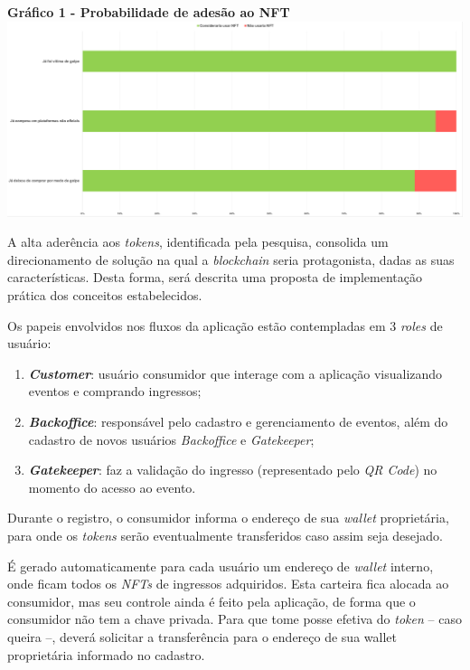 {\begin{center}
    \centering
    \textbf{Gráfico 1 - Probabilidade de adesão ao NFT}
    \includegraphics[scale=0.24]{figuras/grafico-pesquisa.png}
    \label{graf:grafico-pesquisa}
\end{center}

A alta aderência aos \textit{tokens}, identificada pela pesquisa, consolida um direcionamento de solução na qual a \textit{blockchain} seria protagonista, dadas as suas características. Desta forma, será descrita uma proposta de implementação prática dos conceitos estabelecidos.


Os papeis envolvidos nos fluxos da aplicação estão contempladas em 3 \textit{roles} de usuário:
\begin{enumerate} 
    \item \textit{\textbf{Customer}}: usuário consumidor que interage com a aplicação visualizando eventos e comprando ingressos; 
    
    \item \textit{\textbf{Backoffice}}: responsável pelo cadastro e gerenciamento de eventos, além do cadastro de novos usuários \textit{Backoffice} e \textit{Gatekeeper}; 
    
    \item \textit{\textbf{Gatekeeper}}: faz a validação do ingresso (representado pelo \textit{QR Code}) no momento do acesso ao evento. 
\end{enumerate}

Durante o registro, o consumidor informa o endereço de sua \textit{wallet} proprietária, para onde os \textit{tokens} serão eventualmente transferidos caso assim seja desejado.

É gerado automaticamente para cada usuário um endereço de \textit{wallet} interno, onde ficam todos os \textit{NFTs} de ingressos adquiridos. Esta carteira fica alocada ao consumidor, mas seu controle ainda é feito pela aplicação, de forma que o consumidor não tem a chave privada. Para que tome posse efetiva do \textit{token} -- caso queira --, deverá solicitar a transferência para o endereço de sua wallet proprietária informado no cadastro.
    
}
